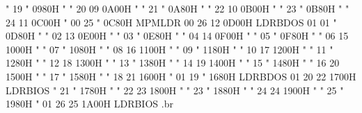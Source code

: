         "      19        "          0980H               "
        "      20       09          0A00H               "
        "      21        "          0A80H               "
        "      22       10          0B00H               "
        "      23        "          0B80H               "
        "      24       11          0C00H               "
       00      25        "          0C80H              MPMLDR
       00      26       12          0D00H              LDRBDOS
       01      01        "          0D80H               "
        "      02       13          0E00H               "
        "      03        "          0E80H               "
        "      04       14          0F00H               "
        "      05        "          0F80H               "
        "      06       15          1000H               "
        "      07        "          1080H               "
        "      08       16          1100H               "
        "      09        "          1180H               "
        "      10       17          1200H               "
        "      11        "          1280H               "
        "      12       18          1300H               "
        "      13        "          1380H               "
        "      14       19          1400H               "
        "      15        "          1480H               "
        "      16       20          1500H               "
        "      17        "          1580H               "
        "      18       21          1600H               "
        01     19        "          1680H              LDRBDOS
        01     20       22          1700H              LDRBIOS
        "      21        "          1780H               "
        "      22       23          1800H               "
        "      23        "          1880H               "
        "      24       24          1900H               "
        "      25        "          1980H               "
        01     26       25          1A00H              LDRBIOS
.br

